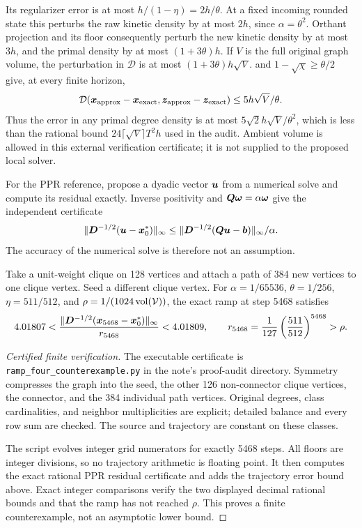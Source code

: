 Its regularizer error is at most
$h/(1-\eta)=2h/\theta$. At a fixed incoming rounded state this perturbs
the raw kinetic density by at most $2h$, since $\alpha=\theta^2$.
Orthant projection and its floor consequently perturb the new kinetic
density by at most $3h$, and the primal density by at most $(1+3\theta)h$.
If $V$ is the full original graph volume, the perturbation in
$\mathcal D$ is at most $(1+3\theta)h\sqrt V$.
 and
$1-\sqrt\chi\geq\theta/2$ give, at every finite horizon,
\[
 \mathcal D(\bm{x}_{\rm approx}-\bm{x}_{\rm exact},
            \bm{z}_{\rm approx}-\bm{z}_{\rm exact})
 \leq5h\sqrt V/\theta.
\]
Thus the error in any primal degree density is at most
$5\sqrt2h\sqrt V/\theta^2$, which is less than the rational bound
$24\lceil\sqrt V\rceil T^2h$ used in the audit. Ambient volume is allowed
in this external verification certificate; it is not supplied to the
proposed local solver.

For the PPR reference, propose a dyadic vector $\bm{u}$ from a numerical solve
and compute its residual exactly. Inverse positivity and
$\bm{Q}\bm{\omega}=\alpha\bm{\omega}$ give the independent certificate
\[
 \|\bm{D}^{-1/2}(\bm{u}-\bm{x}_0^*)\|_\infty
 \leq\|\bm{D}^{-1/2}(\bm{Q}\bm{u}-\bm{b})\|_\infty/\alpha.
\]
The accuracy of the numerical solve is therefore not an assumption.

\begin{proposition}
\label{prop:revisit-four-fails}
Take a unit-weight clique on 128 vertices and attach a path of 384 new
vertices to one clique vertex. Seed a different clique vertex. For
$\alpha=1/65536$, $\theta=1/256$, $\eta=511/512$, and
$\rho=1/(1024\operatorname{vol}(\mathcal V))$, the exact ramp at step 5468 satisfies
\[
 4.01807<
 \frac{\|\bm{D}^{-1/2}(\bm{x}_{5468}-\bm{x}_0^*)\|_\infty}{r_{5468}}
 <4.01809,
 \qquad r_{5468}=\frac1{127}\left(\frac{511}{512}\right)^{5468}>\rho.
\]
\end{proposition}
\begin{proof}[Certified finite verification]
The executable certificate is \texttt{ramp\_four\_counterexample.py} in the
note's proof-audit directory. Symmetry compresses the graph into the seed,
the other 126 non-connector clique vertices, the connector, and the 384
individual path vertices. Original degrees, class cardinalities, and
neighbor multiplicities are explicit; detailed balance and every row sum
are checked. The source and trajectory are constant on these classes.

The script evolves integer grid numerators for exactly 5468 steps. All
floors are integer divisions, so no trajectory arithmetic is floating point.
It then computes the exact rational PPR residual certificate and adds the
trajectory error bound above. Exact integer comparisons verify the two
displayed decimal rational bounds and that the ramp has not reached $\rho$.
This proves a finite counterexample, not an asymptotic lower bound.
\end{proof}

